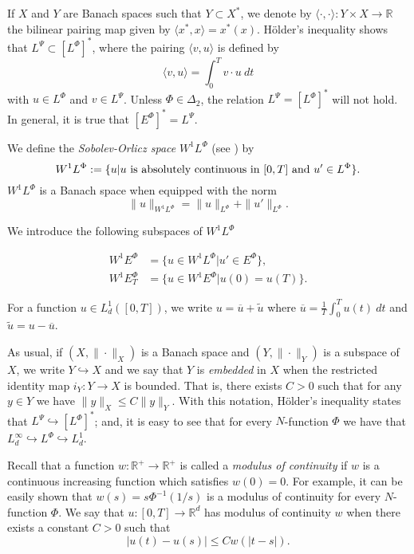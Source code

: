 \documentclass[twoside]{article}
\theoremstyle{remark}
\newcommand{\orlnor}{\|_{L^{\Phi}}}
\newcommand{\lphi}{L^{\Phi}}
\newcommand{\lpsi}{L^{\Psi}}
\newcommand{\ephi}{E^{\Phi}}
\newcommand{\wphi}{W^{1}\lphi}
\newcommand{\wphie}{W^{1}\ephi}
\newcommand{\rr}{\mathbb{R}}
\renewcommand{\leq}{\leqslant}
\begin{document}
If $X$ and $Y$ are  Banach spaces such that  $Y\subset X^*$, we denote by $\langle\cdot,\cdot\rangle:Y\times X\to\mathbb{R}$ the bilinear pairing  map given by $\langle x^*,x\rangle=x^*(x)$. H\"older's inequality shows that $\lpsi\subset \left[\lphi\right]^*$, where the pairing
$\langle v, u\rangle$
is defined by 
\begin{equation}\label{pairing}
  \langle v,u\rangle=\int_0^Tv\cdot u\ dt
\end{equation}
with  $u\in\lphi$ and $v\in\lpsi$.
 Unless $\Phi \in \Delta_2$, the relation $\lpsi= \left[\lphi\right]^*$ will not hold. In general, it is true  that  $\left[\ephi\right]^*=\lpsi$.



We define the \emph{Sobolev-Orlicz space} $\wphi$ (see \cite{adams_sobolev}) by
\[\wphi:=\{u| u \hbox{ is absolutely continuous in $[0,T]$ and } u'\in \lphi\}.\]
$\wphi$ is a Banach space when equipped with the norm
\begin{equation}\label{def-norma-orlicz-sob}
\|  u  \|_{\wphi}= \|  u  \|_{\lphi} + \|u'\orlnor.
\end{equation}

We introduce the following subspaces of $\wphi$

\begin{equation}\label{def-esp-orlicz-sob-per}
\begin{split}
\wphie&=\{u\in\wphi|u'\in\ephi\},\\
\wphie_T&=\{u\in\wphie|u(0)=u(T)\}.
\end{split}
\end{equation}



For a  function $u\in L^1_d([0,T])$, we write $u=\overline{u}+\widetilde{u}$ where $\overline{u} =\frac1T\int_0^T u(t)\ dt$ and $\widetilde{u}=u-\overline{u}$.

As usual, if $(X,\|\cdot\|_X)$ is a Banach space and $(Y,\|\cdot \|_Y)$ is a subspace of $X$,  we write $Y\hookrightarrow X$ and we say that $Y$ is \emph{embedded} in $X$  when the restricted identity map $i_Y:Y\to X$ is bounded. That is, there exists $C>0$ such that  for any $y\in Y$ we have $\|y\|_X\leq C\|y\|_Y$.  With this notation, H\"older's inequality states that  $\lpsi\hookrightarrow  \left[\lphi\right]^*$; and, it is easy to see that for every $N$-function $\Phi$ we have that $L^{\infty}_d\hookrightarrow\lphi \hookrightarrow L^1_d$.


 Recall that a function   $w:\mathbb{R}^+\to \mathbb{R}^+$ is called  a \emph{modulus of continuity} if $w$ is a continuous increasing function which satisfies $w(0)=0$. For example, it can be easily shown that $w(s)=s\Phi^{-1}(1/s)$ is a modulus of  continuity for every $N$-function $\Phi$.  We say that $u:[0,T]\to\rr^d$  has modulus of continuity $w$  when there exists a constant $C>0$ such that
\begin{equation}\label{w-holder}|u(t)-u(s)|\leq Cw(|t-s|).
\end{equation}
\end{document}
